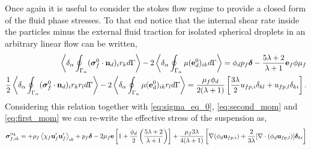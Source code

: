Once again it is useful to consider the stokes flow regime to provide a closed form of the fluid phase stresses. 
To that end notice that the internal shear rate inside the particles minus the external fluid traction for isolated spherical droplets in an arbitrary linear flow can be written, 
\begin{align*}
    \left<\delta_\alpha \oint_{\Gamma_{\alpha}} (\bm{\sigma}_f^0 \cdot \textbf{n}_d)_ir_k d\Gamma\right> -
    2\left<\delta_\alpha \oint_{\Gamma_{\alpha}} {\mu(\textbf{e}_d^0)_{ik}} d\Gamma\right> 
    = 
    \phi_d p_f\bm\delta
    - \frac{5\lambda +2}{\lambda +1}
    \textbf{e}_f \phi \mu_f
    \\
    \frac{1}{2}\left<\delta_\alpha \oint_{\Gamma_{\alpha}} (\bm{\sigma}_f^0 \cdot \textbf{n}_d)_ir_kr_l d\Gamma\right> -
    2\left<\delta_\alpha \oint_{\Gamma_{\alpha}} {\mu(\textbf{e}_d^0)_{ik} r_l} d\Gamma\right> 
    = 
    \frac{\mu_f\phi_d}{2(\lambda +1) }
    \left[
        \frac{3\lambda}{2} 
        u_{fp,i}\delta_{kl}
        +  u_{fp,l}\delta_{ki}
    \right]. 
\end{align*}
Considering this relation together with \ref{eq:sigma_eq_0}, \ref{eq:second_mom} and \ref{eq:first_mom} we can re-write the effective stress of the suspension as, 
\begin{align*}
    \bm{\sigma}^\text{eq}_{f,ik} =
    + \rho_f\left<\chi_f\textbf{u}_f'\textbf{u}_f'\right>_{ik} 
    + p_f \bm\delta
    - 2 \mu_f \textbf{e}\left[
        1
        +\frac{\phi_d}{2}\left(
            \frac{5\lambda +2}{\lambda +1}
        \right)
    \right]
    + 
    \frac{\mu_f 3\lambda}{4(\lambda +1) }
    \left[
        \mathbf{\nabla} (\phi_d\textbf{u}_{fp,i})
        +  
        \frac{2}{3\lambda} 
        [\mathbf{\nabla}\cdot (\phi_d\textbf{u}_{fp,l})]\bm\delta_{ki}
    \right]
\end{align*} 
